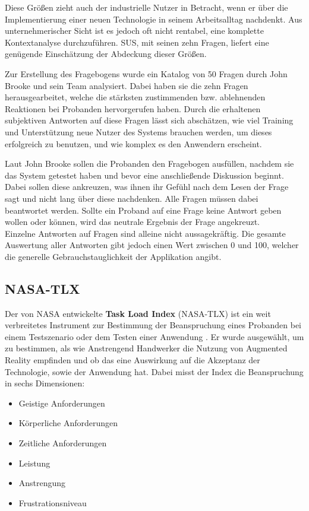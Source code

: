 Diese Größen zieht auch der industrielle Nutzer in Betracht, wenn er über die Implementierung einer neuen Technologie in seinem Arbeitsalltag nachdenkt. Aus unternehmerischer Sicht ist es jedoch oft nicht rentabel, eine komplette Kontextanalyse durchzuführen. SUS, mit seinen zehn Fragen, liefert eine genügende Einschätzung der Abdeckung dieser Größen.

Zur Erstellung des Fragebogens wurde ein Katalog von 50 Fragen durch John Brooke und sein Team analysiert. Dabei haben sie die zehn Fragen herausgearbeitet, welche die stärksten zustimmenden bzw. ablehnenden Reaktionen bei Probanden hervorgerufen haben. Durch die erhaltenen subjektiven Antworten auf diese Fragen lässt sich abschätzen, wie viel Training und Unterstützung neue Nutzer des Systems brauchen werden, um dieses erfolgreich zu benutzen, und wie komplex es den Anwendern erscheint.

Laut John Brooke \cite{brooke_sus_nodate} sollen die Probanden den Fragebogen ausfüllen, nachdem sie das System getestet haben und bevor eine anschließende Diskussion beginnt. Dabei sollen diese ankreuzen, was ihnen ihr Gefühl nach dem Lesen der Frage sagt und nicht lang über diese nachdenken. Alle Fragen müssen dabei beantwortet werden. Sollte ein Proband auf eine Frage keine Antwort geben wollen oder können, wird das neutrale Ergebnis der Frage angekreuzt. \\
Einzelne Antworten auf Fragen sind alleine nicht aussagekräftig. Die gesamte Auswertung aller Antworten gibt jedoch einen Wert zwischen 0 und 100, welcher die generelle Gebrauchstauglichkeit der Applikation angibt.

\subsection{NASA-TLX}

Der von NASA entwickelte \textbf{Task Load Index} (NASA-TLX) ist ein weit verbreitetes Instrument zur Bestimmung der Beanspruchung eines Probanden bei einem Testszenario oder dem Testen einer Anwendung \cite{giesa_bewertung_2003}. Er wurde ausgewählt, um zu bestimmen, als wie Anstrengend Handwerker die Nutzung von Augmented Reality empfinden und ob das eine Auswirkung auf die Akzeptanz der Technologie, sowie der Anwendung hat. Dabei misst der Index die Beanspruchung in sechs Dimensionen:

\begin{itemize}
	\item Geistige Anforderungen
	\item Körperliche Anforderungen
	\item Zeitliche Anforderungen
	\item Leistung
	\item Anstrengung
	\item Frustrationsniveau
\end{itemize}

